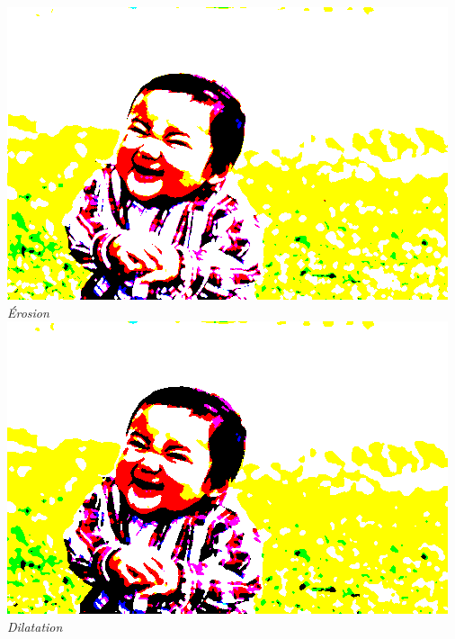\documentclass[a4paper,11pt]{article}
\begin{document}
\begin{center}
\includegraphics[scale=0.7]{babyerodec1.png}\\
\textit{Érosion}\\
\includegraphics[scale=0.7]{babydilatecL.png}\\
\textit{Dilatation}
\end{center}
\end{document}
